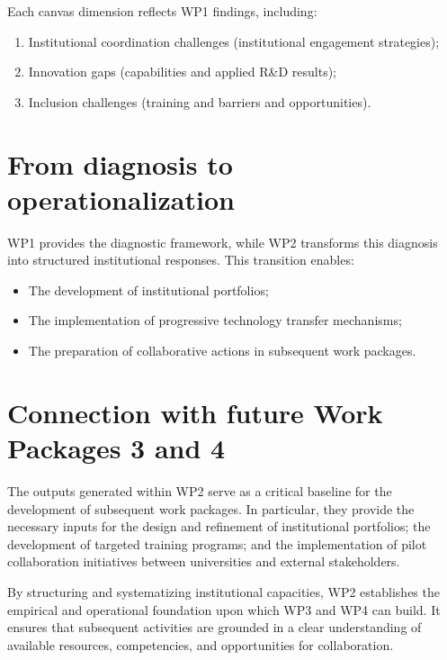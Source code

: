 \documentclass[
  12pt,
  oneside]{book}
\providecommand{\tightlist}{%
  \setlength{\itemsep}{0pt}\setlength{\parskip}{0pt}}
\begin{document}
Each canvas dimension reflects WP1 findings, including:

\begin{enumerate}
\def\labelenumi{\arabic{enumi}.}
\tightlist
\item
  Institutional coordination challenges (institutional engagement
  strategies);
\item
  Innovation gaps (capabilities and applied R\&D results);
\item
  Inclusion challenges (training and barriers and opportunities).
\end{enumerate}

\section{From diagnosis to
operationalization}\label{from-diagnosis-to-operationalization}

WP1 provides the diagnostic framework, while WP2 transforms this
diagnosis into structured institutional responses. This transition
enables:

\begin{itemize}
\tightlist
\item
  The development of institutional portfolios;
\item
  The implementation of progressive technology transfer mechanisms;
\item
  The preparation of collaborative actions in subsequent work packages.
\end{itemize}

\section{Connection with future Work Packages 3 and
4}\label{connection-with-future-work-packages-3-and-4}

The outputs generated within WP2 serve as a critical baseline for the
development of subsequent work packages. In particular, they provide the
necessary inputs for the design and refinement of institutional
portfolios; the development of targeted training programs; and the
implementation of pilot collaboration initiatives between universities
and external stakeholders.

By structuring and systematizing institutional capacities, WP2
establishes the empirical and operational foundation upon which WP3 and
WP4 can build. It ensures that subsequent activities are grounded in a
clear understanding of available resources, competencies, and
opportunities for collaboration.
\end{document}
